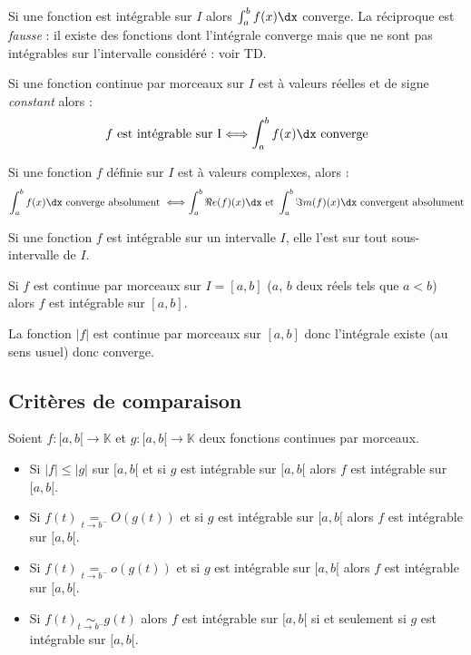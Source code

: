 \documentclass[a4paper,10pt]{report}
\begin{document}
\begin{rems}
\item Si une fonction est intégrable sur $I$ alors $\int_{a}^b f(x) \dx$ converge. La réciproque est \textit{fausse} : il existe des fonctions dont l'intégrale converge mais que ne sont pas intégrables sur l'intervalle considéré : voir TD.
\item Si une fonction continue par morceaux sur $I$ est à valeurs réelles et de signe \textit{constant} alors :
$$ f \hbox{ est intégrable sur I} \Longleftrightarrow \int_{a}^b f(x) \dx \hbox{ converge}$$
\item Si une fonction $f$ définie sur $I$ est à valeurs complexes, alors :
$$ \int_{a}^b f(x) \dx \hbox{ converge absolument } \Longleftrightarrow \int_{a}^b \Re e(f)(x) \dx \hbox{ et }  \int_{a}^b \Im m(f)(x) \dx \hbox{ convergent absolument} $$
\end{rems}

\begin{prop} Si une fonction $f$ est intégrable sur un intervalle $I$, elle l'est sur tout sous-intervalle de $I$.
\end{prop}

\begin{prop} Si $f$ est continue par morceaux sur $I=[a,b]$ ($a$, $b$ deux réels tels que $a <b$)  alors $f$ est intégrable sur $[a,b]$.
\end{prop}

\begin{preuve}
La fonction $\vert f \vert$ est continue par morceaux sur $[a,b]$ donc l'intégrale existe (au sens usuel) donc converge.
\end{preuve}


\subsection{Critères de comparaison}

\begin{thm} Soient $f : [a,b[ \rightarrow \mathbb{K}$ et $g : [a,b[ \rightarrow \mathbb{K}$ deux fonctions continues par morceaux.

\begin{itemize}
\item Si $\vert f \vert \leq \vert g \vert$ sur $[a,b[$ et si $g$ est intégrable sur $[a,b[$ alors $f$ est intégrable sur $[a,b[$.
\item Si $f(t) \underset{ t \rightarrow b^{-}}{=} O(g(t))  $ et si $g$ est intégrable sur $[a,b[$ alors $f$ est intégrable sur $[a,b[$.
\item Si $f(t) \underset{ t \rightarrow b^{-}}{=} o(g(t))  $ et si $g$ est intégrable sur $[a,b[$ alors $f$ est intégrable sur $[a,b[$.
\item Si $f(t) \underset{ t \rightarrow b^{-}}{\sim}g(t)$ alors $f$ est intégrable sur $[a,b[$ si et seulement si $g$ est intégrable sur $[a,b[$.
\end{itemize}
\end{thm}
\end{document}
